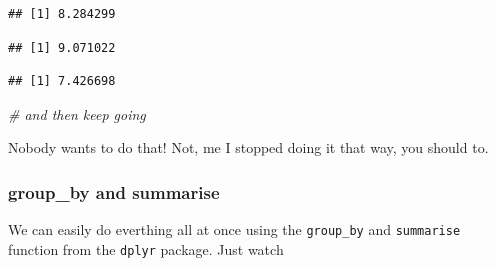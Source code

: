 \documentclass[]{book}
\newenvironment{Shaded}{\begin{snugshade}}{\end{snugshade}}
\newcommand{\KeywordTok}[1]{\textcolor[rgb]{0.13,0.29,0.53}{\textbf{{#1}}}}
\newcommand{\DataTypeTok}[1]{\textcolor[rgb]{0.13,0.29,0.53}{{#1}}}
\newcommand{\StringTok}[1]{\textcolor[rgb]{0.31,0.60,0.02}{{#1}}}
\newcommand{\CommentTok}[1]{\textcolor[rgb]{0.56,0.35,0.01}{\textit{{#1}}}}
\newcommand{\NormalTok}[1]{{#1}}
\theoremstyle{definition}
\theoremstyle{definition}
\theoremstyle{definition}
\theoremstyle{remark}
\begin{document}
\begin{verbatim}
## [1] 8.284299
\end{verbatim}

\begin{Shaded}
\end{Shaded}

\begin{verbatim}
## [1] 9.071022
\end{verbatim}

\begin{Shaded}
\end{Shaded}

\begin{verbatim}
## [1] 7.426698
\end{verbatim}

\begin{Shaded}
\begin{Highlighting}[]
\CommentTok{# and then keep going}
\end{Highlighting}
\end{Shaded}

Nobody wants to do that! Not, me I stopped doing it that way, you should
to.

\subsubsection{group\_by and summarise}\label{group_by-and-summarise}

We can easily do everthing all at once using the \texttt{group\_by} and
\texttt{summarise} function from the \texttt{dplyr} package. Just watch

\begin{Shaded}
\end{Shaded}
\end{document}
